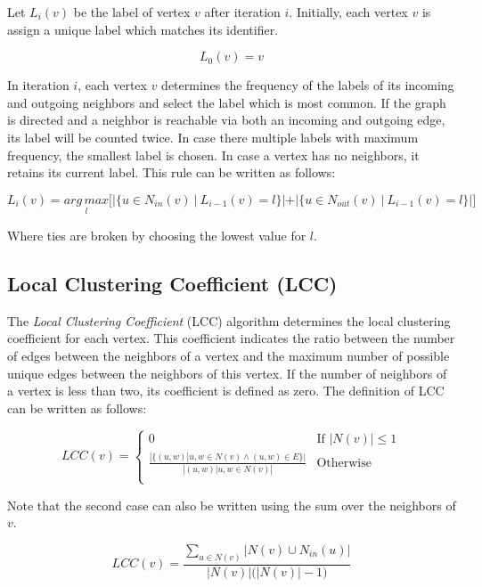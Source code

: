 Let $L_i(v)$ be the label of vertex $v$ after iteration $i$. Initially, each vertex $v$ is assign a unique label which matches its identifier.

\begin{equation}
L_0(v) = v
\end{equation}

In iteration $i$, each vertex $v$ determines the frequency of the labels of its incoming and outgoing neighbors and select the label which is most common.  If the graph is directed and a neighbor is reachable via both an incoming and outgoing edge, its label will be counted twice. In case there multiple labels with maximum frequency, the smallest label is chosen. In case a vertex has no neighbors, it retains its current label. This rule can be written as follows:

\begin{equation}
L_i(v) = \underset{l}{arg\,max} \Big[ |\{ u \in N_{in}(v)~|~L_{i-1}(v) = l \}| + |\{ u \in N_{out}(v)~|~L_{i-1}(v) = l \}| \Big]
\end{equation}

Where ties are broken by choosing the lowest value for $l$.




\subsection{Local Clustering Coefficient (LCC)}
The \emph{Local Clustering Coefficient} (LCC) algorithm determines the local clustering coefficient for each vertex. This coefficient indicates the ratio between the number of edges between the neighbors of a vertex and the maximum number of possible unique edges between the neighbors of this vertex. If the number of neighbors of a vertex is less than two, its coefficient is defined as zero. The definition of LCC can be written as follows:

\begin{equation}
LCC(v) = \begin{cases}
0 & \text{If } |N(v)| \leq 1 \\
\frac{|\{(u, w) | u, w \in N(v) \wedge (u, w) \in E\}|}
{|{(u,w) | u, w \in N(v)}|} & \text{Otherwise} \\
\end{cases}
\end{equation}

Note that the second case can also be written using the sum over the neighbors of $v$.

\begin{equation}
LCC(v) = \frac{\sum_{u \in N(v)} |N(v) \cup N_{in}(u)|}{|N(v)| \big( |N(v)| - 1 \big)} 
\end{equation}



